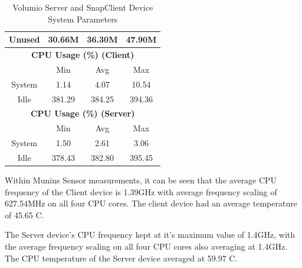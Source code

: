 \documentclass[11pt,a4paper,headinclude=false,footinclude=false]{scrreprt}
\begin{document}
\begin{table}[H]
\begin{tabular}{||c|c|c|c|c|c|c||}
    \hline
    Unused & \multicolumn{2}{|c|}{30.66M} & \multicolumn{2}{|c|}{36.30M} & \multicolumn{2}{|c|}{47.90M} \\
    \hline\hline
    \multicolumn{7}{|c|}{\textbf{CPU Usage (\%) (Client)}} \\
    \hline\hline
      & \multicolumn{2}{|c|}{Min} & \multicolumn{2}{|c|}{Avg} & \multicolumn{2}{|c|}{Max} \\
    \hline
    System & \multicolumn{2}{|c|}{1.14} & \multicolumn{2}{|c|}{4.07} & \multicolumn{2}{|c|}{10.54} \\
    \hline
    Idle & \multicolumn{2}{|c|}{381.29} & \multicolumn{2}{|c|}{384.25} & \multicolumn{2}{|c|}{394.36} \\
    \hline\hline
    \multicolumn{7}{|c|}{\textbf{CPU Usage (\%) (Server)}} \\
    \hline\hline
      & \multicolumn{2}{|c|}{Min} & \multicolumn{2}{|c|}{Avg} & \multicolumn{2}{|c|}{Max} \\
    \hline
    System & \multicolumn{2}{|c|}{1.50} & \multicolumn{2}{|c|}{2.61} & \multicolumn{2}{|c|}{3.06} \\
    \hline
    Idle & \multicolumn{2}{|c|}{378.43} & \multicolumn{2}{|c|}{382.80} & \multicolumn{2}{|c|}{395.45} \\
    \hline\hline
    \end{tabular}
    \caption{Volumio Server and SnapClient Device System Parameters}
    \label{VolumioclientserverSysTab}
\end{table}

Within Munins Sensor measurements, it can be seen that the average CPU
frequency of the Client device is 1.39GHz with average frequency scaling
of 627.54MHz on all four CPU cores. The client device had an average
temperature of 45.65 \degree C.

The Server device's CPU frequency kept at it's maximum value of 1.4GHz,
with the average frequency scaling on all four CPU cores also averaging
at 1.4GHz. The CPU temperature of the Server device averaged at 59.97
\degree C.
\end{document}
